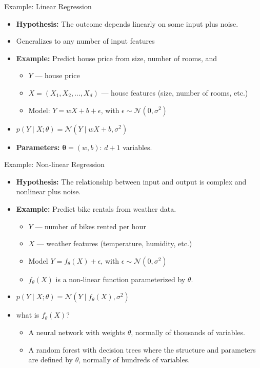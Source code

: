 \documentclass{beamer}
\begin{document}
\begin{frame}{Example: Linear Regression}
  \begin{itemize}
  \item \textbf{Hypothesis:} The outcome depends linearly on some input plus noise.
  \item Generalizes to any number of input features

    \item \textbf{Example:} Predict house price from size, number of rooms, and
      \begin{itemize}
        \item $Y$ — house price
        \item $X = (X_1, X_2, \ldots, X_d)$ — house features (size, number of rooms, etc.)
        \item Model: $Y = wX + b + \epsilon$, with $\epsilon \sim \mathcal{N}(0, \sigma^2)$
        \end{itemize}
    \item $p(Y \mid X; \theta) = \mathcal{N}(Y \mid wX + b, \sigma^2)$
    \item \textbf{Parameters:} $\mathbf{\theta} = (w, b)$: $d+1$ variables.

  \end{itemize}
\end{frame}


\begin{frame}{Example: Non-linear Regression}
  \begin{itemize}
    \item \textbf{Hypothesis:} The relationship between input and output is complex and nonlinear plus noise.
    \item \textbf{Example:} Predict bike rentals from weather data.
      \begin{itemize}
        \item $Y$ — number of bikes rented per hour
        \item $X$ — weather features (temperature, humidity, etc.)
        \item Model $ Y = f_\theta(X) + \epsilon$, with $\epsilon \sim \mathcal{N}(0, \sigma^2)$
          \item $f_\theta(X)$ is a non-linear function parameterized by $\theta$.
          \end{itemize}
        \item $p(Y \mid X; \theta) = \mathcal{N}(Y \mid f_\theta(X), \sigma^2)$
        \item what is $f_\theta(X)$?
          \begin{itemize}
          \item A neural network with weights $\theta$, normally of thousands of variables.
          \item A random forest with decision trees where the structure and parameters are defined by $\theta$, normally of hundreds of variables.
          \end{itemize}
  \end{itemize}
\end{frame}
\end{document}
